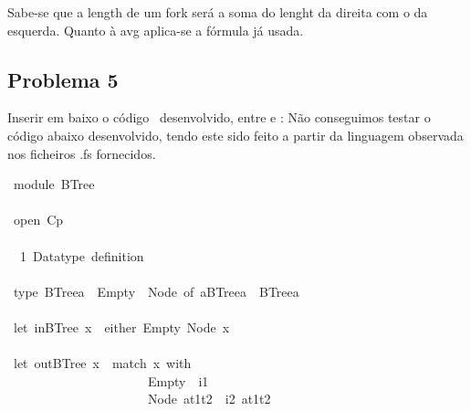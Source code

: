 \documentclass[a4paper]{article}
\begin{document}
Sabe-se que a length de um fork será a soma do lenght da direita com o da esquerda. Quanto à avg aplica-se a fórmula já usada.
\subsection*{Problema 5}
Inserir em baixo o código \Fsharp\ desenvolvido, entre  e :
\newline \newline
Não conseguimos testar o código abaixo desenvolvido, tendo este sido feito a partir da linguagem observada nos ficheiros .fs fornecidos.

\begin{tabbing}\ttfamily
~module~BTree\\
\ttfamily ~\\
\ttfamily ~open~Cp\\
\ttfamily ~\\
\ttfamily ~~1~Datatype~definition~\\
\ttfamily ~\\
\ttfamily ~type~BTreea~~Empty~~Node~of~aBTreea~~BTreea\\
\ttfamily ~\\
\ttfamily ~let~inBTree~x~~either~Empty~Node~x\\
\ttfamily ~\\
\ttfamily ~let~outBTree~x~~match~x~with\\
\ttfamily ~~~~~~~~~~~~~~~~~~~~~~Empty~~i1~\\
\ttfamily ~~~~~~~~~~~~~~~~~~~~~~Node~at1t2~~i2~at1t2\\

\end{tabbing}
\end{document}
